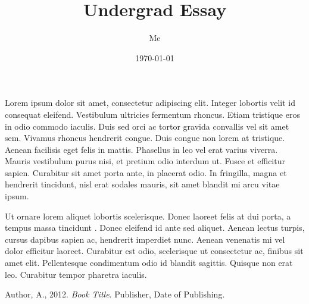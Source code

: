 \documentclass[a4paper,12pt]{article}
\title{Undergrad Essay}
\date{\today}
\author{Me}
\begin{document}
\maketitle

\newpage

Lorem ipsum dolor sit amet, consectetur adipiscing elit. Integer lobortis velit
id consequat eleifend. Vestibulum ultricies fermentum rhoncus. Etiam tristique
eros in odio commodo iaculis. Duis sed orci ac tortor gravida convallis vel sit
amet sem. Vivamus rhoncus hendrerit congue. Duis congue non lorem at tristique.
Aenean facilisis eget felis in mattis. Phasellus in leo vel erat varius
viverra. Mauris vestibulum purus nisi, et pretium odio interdum ut. Fusce et
efficitur sapien. Curabitur sit amet porta ante, in placerat odio. In
fringilla, magna et hendrerit tincidunt, nisl erat sodales mauris, sit amet
blandit mi arcu vitae ipsum.

Ut ornare lorem aliquet lobortis scelerisque. Donec laoreet felis at dui porta,
a tempus massa tincidunt \cite{citation}. Donec eleifend id ante sed aliquet. Aenean lectus
turpis, cursus dapibus sapien ac, hendrerit imperdiet nunc. Aenean venenatis mi
vel dolor efficitur laoreet. Curabitur est odio, scelerisque ut consectetur ac,
finibus sit amet elit. Pellentesque condimentum odio id blandit sagittis.
Quisque non erat leo. Curabitur tempor pharetra iaculis.


\clearpage

\begin{thebibliography}{5}

  Author, A., 2012. 
  \textit{Book Title}.
  Publisher, Date of Publishing. 

\end{thebibliography}
\end{document}
